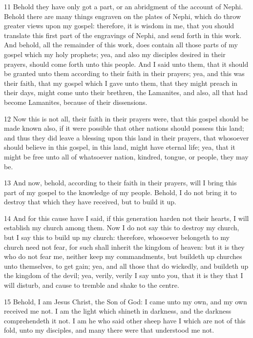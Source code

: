 				11 Behold they have only got a part, or an abridgment of the account of Nephi. Behold there are many things engraven on the plates of Nephi, which do throw greater views upon my gospel: therefore, it is wisdom in me, that you should translate this first part of the engravings of Nephi, and send forth in this work. And behold, all the remainder of this work, does contain all those parts of my gospel which my holy prophets; yea, and also my disciples desired in their prayers, should come forth unto this people. And I said unto them, that it should be granted unto them according to their faith in their prayers; yea, and this was their faith, that my gospel which I gave unto them, that they might preach in their days, might come unto their brethren, the Lamanites, and also, all that had become Lamanites, because of their dissensions.

				12 Now this is not all, their faith in their prayers were, that this gospel should be made known also, if it were possible that other nations should possess this land; and thus they did leave a blessing upon this land in their prayers, that whosoever should believe in this gospel, in this land, might have eternal life; yea, that it might be free unto all of whatsoever nation, kindred, tongue, or people, they may be.

				13 And now, behold, according to their faith in their prayers, will I bring this part of my gospel to the knowledge of my people. Behold, I do not bring it to destroy that which they have received, but to build it up.

				14 And for this cause have I said, if this generation harden not their hearts, I will establish my church among them. Now I do not say this to destroy my church, but I say this to build up my church: therefore, whosoever belongeth to my church need not fear, for such shall inherit the kingdom of heaven: but it is they who do not fear me, neither keep my commandments, but buildeth up churches unto themselves, to get gain; yea, and all those that do wickedly, and buildeth up the kingdom of the devil; yea, verily, verily I say unto you, that it is they that I will disturb, and cause to tremble and shake to the centre.

				15 Behold, I am Jesus Christ, the Son of God: I came unto my own, and my own received me not. I am the light which shineth in darkness, and the darkness comprehendeth it not. I am he who said other sheep have I which are not of this fold, unto my disciples, and many there were that understood me not.

